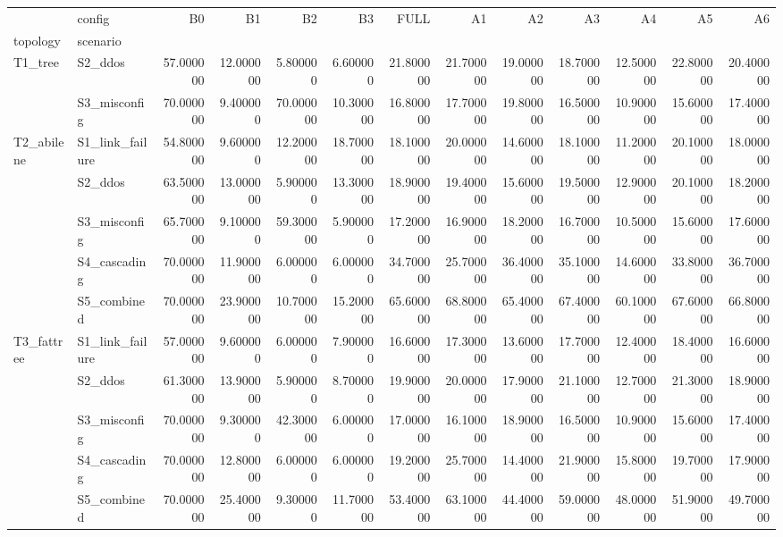 \begin{tabular}{llrrrrrrrrrrr}
\toprule
 & config & B0 & B1 & B2 & B3 & FULL & A1 & A2 & A3 & A4 & A5 & A6 \\
topology & scenario &  &  &  &  &  &  &  &  &  &  &  \\
\midrule
\multirow[t]{2}{*}{T1_tree} & S2_ddos & 57.000000 & 12.000000 & 5.800000 & 6.600000 & 21.800000 & 21.700000 & 19.000000 & 18.700000 & 12.500000 & 22.800000 & 20.400000 \\
 & S3_misconfig & 70.000000 & 9.400000 & 70.000000 & 10.300000 & 16.800000 & 17.700000 & 19.800000 & 16.500000 & 10.900000 & 15.600000 & 17.400000 \\
\cline{1-13}
\multirow[t]{5}{*}{T2_abilene} & S1_link_failure & 54.800000 & 9.600000 & 12.200000 & 18.700000 & 18.100000 & 20.000000 & 14.600000 & 18.100000 & 11.200000 & 20.100000 & 18.000000 \\
 & S2_ddos & 63.500000 & 13.000000 & 5.900000 & 13.300000 & 18.900000 & 19.400000 & 15.600000 & 19.500000 & 12.900000 & 20.100000 & 18.200000 \\
 & S3_misconfig & 65.700000 & 9.100000 & 59.300000 & 5.900000 & 17.200000 & 16.900000 & 18.200000 & 16.700000 & 10.500000 & 15.600000 & 17.600000 \\
 & S4_cascading & 70.000000 & 11.900000 & 6.000000 & 6.000000 & 34.700000 & 25.700000 & 36.400000 & 35.100000 & 14.600000 & 33.800000 & 36.700000 \\
 & S5_combined & 70.000000 & 23.900000 & 10.700000 & 15.200000 & 65.600000 & 68.800000 & 65.400000 & 67.400000 & 60.100000 & 67.600000 & 66.800000 \\
\cline{1-13}
\multirow[t]{5}{*}{T3_fattree} & S1_link_failure & 57.000000 & 9.600000 & 6.000000 & 7.900000 & 16.600000 & 17.300000 & 13.600000 & 17.700000 & 12.400000 & 18.400000 & 16.600000 \\
 & S2_ddos & 61.300000 & 13.900000 & 5.900000 & 8.700000 & 19.900000 & 20.000000 & 17.900000 & 21.100000 & 12.700000 & 21.300000 & 18.900000 \\
 & S3_misconfig & 70.000000 & 9.300000 & 42.300000 & 6.000000 & 17.000000 & 16.100000 & 18.900000 & 16.500000 & 10.900000 & 15.600000 & 17.400000 \\
 & S4_cascading & 70.000000 & 12.800000 & 6.000000 & 6.000000 & 19.200000 & 25.700000 & 14.400000 & 21.900000 & 15.800000 & 19.700000 & 17.900000 \\
 & S5_combined & 70.000000 & 25.400000 & 9.300000 & 11.700000 & 53.400000 & 63.100000 & 44.400000 & 59.000000 & 48.000000 & 51.900000 & 49.700000 \\
\cline{1-13}
\bottomrule
\end{tabular}
